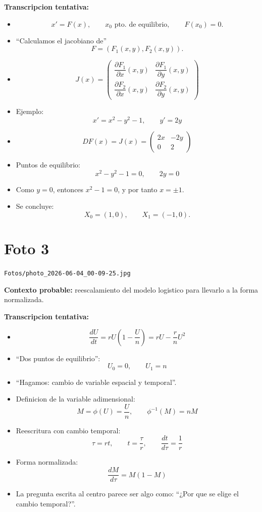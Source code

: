 \documentclass[11pt,letterpaper]{article}
\begin{document}
\textbf{Transcripcion tentativa:}
\begin{itemize}[leftmargin=*]
    \item \[
    x' = F(x), \qquad x_0 \text{ pto. de equilibrio}, \qquad F(x_0)=0.
    \]
    \item ``Calculamos el jacobiano de''
    \[
    F=(F_1(x,y),F_2(x,y)).
    \]
    \item
    \[
    J(x)=
    \begin{pmatrix}
    \dfrac{\partial F_1}{\partial x}(x,y) & \dfrac{\partial F_1}{\partial y}(x,y)\\[6pt]
    \dfrac{\partial F_2}{\partial x}(x,y) & \dfrac{\partial F_2}{\partial y}(x,y)
    \end{pmatrix}
    \]
    \item Ejemplo:
    \[
    x' = x^2-y^2-1, \qquad y' = 2y
    \]
    \item
    \[
    DF(x)=J(x)=
    \begin{pmatrix}
    2x & -2y\\
    0 & 2
    \end{pmatrix}
    \]
    \item Puntos de equilibrio:
    \[
    x^2-y^2-1=0, \qquad 2y=0
    \]
    \item Como \(y=0\), entonces \(x^2-1=0\), y por tanto \(x=\pm 1\).
    \item Se concluye:
    \[
    X_0=(1,0), \qquad X_1=(-1,0).
    \]
\end{itemize}

\section*{Foto 3}
\texttt{Fotos/photo\_2026-06-04\_00-09-25.jpg}

\textbf{Contexto probable:} reescalamiento del modelo logistico para llevarlo a la forma normalizada.

\textbf{Transcripcion tentativa:}
\begin{itemize}[leftmargin=*]
    \item \[
    \frac{dU}{dt}=rU\left(1-\frac{U}{n}\right)=rU-\frac{r}{n}U^2
    \]
    \item ``Dos puntos de equilibrio'':
    \[
    U_0=0, \qquad U_1=n
    \]
    \item ``Hagamos: cambio de variable espacial y temporal''.
    \item Definicion de la variable adimensional:
    \[
    M=\phi(U)=\frac{U}{n}, \qquad \phi^{-1}(M)=nM
    \]
    \item Reescritura con cambio temporal:
    \[
    \tau=rt, \qquad t=\frac{\tau}{r}, \qquad \frac{dt}{d\tau}=\frac{1}{r}
    \]
    \item Forma normalizada:
    \[
    \frac{dM}{d\tau}=M(1-M)
    \]
    \item La pregunta escrita al centro parece ser algo como: ``¿Por que se elige el cambio temporal?''.
\end{itemize}
\end{document}
